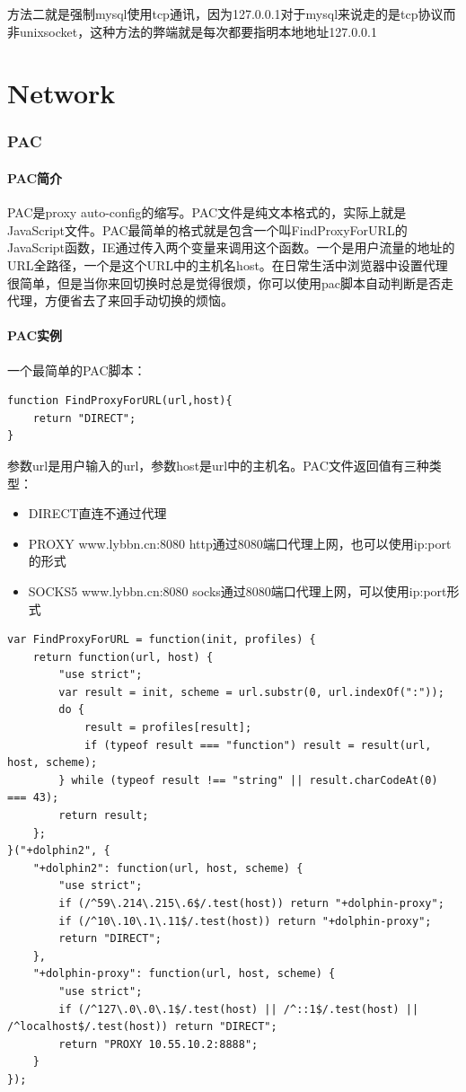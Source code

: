 \documentclass[letter]{book}
\begin{document}
方法二就是强制mysql使用tcp通讯，因为127.0.0.1对于mysql来说走的是tcp协议而非unixsocket，这种方法的弊端就是每次都要指明本地地址127.0.0.1

\part{Network}

\section{PAC}

\subsection{PAC简介}

PAC是proxy auto-config的缩写。PAC文件是纯文本格式的，实际上就是JavaScript文件。PAC最简单的格式就是包含一个叫FindProxyForURL的JavaScript函数，IE通过传入两个变量来调用这个函数。一个是用户流量的地址的URL全路径，一个是这个URL中的主机名host。在日常生活中浏览器中设置代理很简单，但是当你来回切换时总是觉得很烦，你可以使用pac脚本自动判断是否走代理，方便省去了来回手动切换的烦恼。

\subsection{PAC实例}

一个最简单的PAC脚本：

\begin{lstlisting}[language=VBScript]
function FindProxyForURL(url,host){
	return "DIRECT";
}
\end{lstlisting}

参数url是用户输入的url，参数host是url中的主机名。PAC文件返回值有三种类型：

\begin{itemize}
	\item{DIRECT直连不通过代理}
	\item{PROXY www.lybbn.cn:8080 http通过8080端口代理上网，也可以使用ip:port的形式}
	\item{SOCKS5 www.lybbn.cn:8080 socks通过8080端口代理上网，可以使用ip:port形式}
\end{itemize}

\begin{lstlisting}[language=VBScript]
var FindProxyForURL = function(init, profiles) {
	return function(url, host) {
		"use strict";
		var result = init, scheme = url.substr(0, url.indexOf(":"));
		do {
			result = profiles[result];
			if (typeof result === "function") result = result(url, host, scheme);
		} while (typeof result !== "string" || result.charCodeAt(0) === 43);
		return result;
	};
}("+dolphin2", {
	"+dolphin2": function(url, host, scheme) {
		"use strict";
		if (/^59\.214\.215\.6$/.test(host)) return "+dolphin-proxy";
		if (/^10\.10\.1\.11$/.test(host)) return "+dolphin-proxy";
		return "DIRECT";
	},
	"+dolphin-proxy": function(url, host, scheme) {
		"use strict";
		if (/^127\.0\.0\.1$/.test(host) || /^::1$/.test(host) || /^localhost$/.test(host)) return "DIRECT";
		return "PROXY 10.55.10.2:8888";
	}
});
\end{lstlisting}
\end{document}
